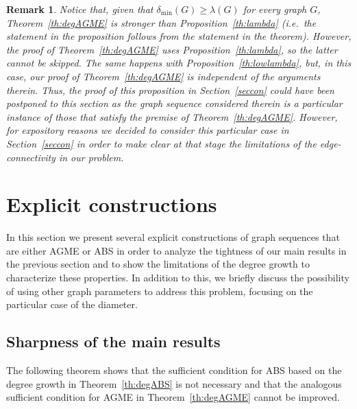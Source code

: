 \documentclass[a4paper,onecolumn,accepted=2024-12-14]{quantumarticle}
\newtheorem{remark}[theorem]{Remark}%
\theoremstyle{plain}
\begin{document}
\begin{remark}
Notice that, given that $\delta_{\mathrm{min}}(G)\geq\lambda(G)$ for every graph $G$, Theorem~\ref{th:degAGME} is stronger than Proposition~\ref{th:lambda} (i.e.\ the statement in the proposition follows from the statement in the theorem). However, the proof of Theorem~\ref{th:degAGME} uses Proposition~\ref{th:lambda}, so the latter cannot be skipped. The same happens with Proposition~\ref{th:lowlambda}, but, in this case, our proof of Theorem~\ref{th:degAGME} is independent of the arguments therein. Thus, the proof of this proposition in Section~\ref{seccon} could have been postponed to this section as the graph sequence considered therein is a particular instance of those that satisfy the premise of Theorem~\ref{th:degAGME}. However, for expository reasons we decided to consider this particular case in Section~\ref{seccon} in order to make clear at that stage the limitations of the edge-connectivity in our problem.
\end{remark}

\section{Explicit constructions}\label{subsecdeg3}

In this section we present several explicit constructions of graph sequences that are either AGME or ABS in order to analyze the tightness of our main results in the previous section and to show the limitations of the degree growth to characterize these properties. In addition to this, we briefly discuss the possibility of using other graph parameters to address this problem, focusing on the particular case of the diameter.

\subsection{Sharpness of the main results}

The following theorem shows that the sufficient condition for ABS based on the degree growth in Theorem~\ref{th:degABS} is not necessary and that the analogous sufficient condition for AGME in Theorem~\ref{th:degAGME} cannot be improved.
\end{document}
